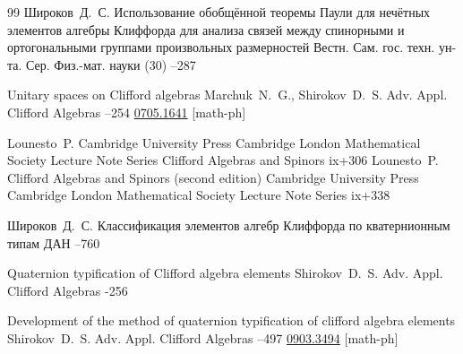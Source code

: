 \begin{thebibliography}{99}
\by Широков~Д.~С.
\paper Использование обобщённой теоремы Паули для нечётных элементов алгебры Клиффорда 
для анализа связей между спинорными и ортогональными группами произвольных размерностей
\jour Вестн. Сам. гос. техн. ун-та. Сер. Физ.-мат. науки
(30)
--287


\paper Unitary spaces on Clifford algebras
\by Marchuk~N.~G., Shirokov~D.~S.
\jour Adv. Appl. Clifford Algebras
--254
\arxiv \href{http://arxiv.org/abs/0705.1641}{0705.1641}  [math-ph]

\by Lounesto~P.
\publ Cambridge University Press
\publaddr Cambridge
\serial 	London Mathematical Society Lecture Note Series	
\book Clifford Algebras and Spinors
\totalpages ix+306 
\moreref
\by Lounesto~P.
\book Clifford Algebras and Spinors \rm (second edition)
\publ Cambridge University Press
\publaddr Cambridge 
\serial 	London Mathematical Society Lecture Note Series	
\totalpages ix+338


\by Широков~Д.~С.
\paper Классификация элементов алгебр Клиффорда по кватернионным типам
\jour ДАН
--760


\paper Quaternion typification of Clifford algebra elements
\by Shirokov~D.~S.
\jour Adv. Appl. Clifford Algebras
-256

\paper Development of the method of quaternion typification of clifford algebra elements
\by Shirokov~D.~S.
\jour Adv. Appl. Clifford Algebras
--497
\arxiv \href{http://arxiv.org/abs/0903.3494}{0903.3494}  [math-ph]

\end{thebibliography}

